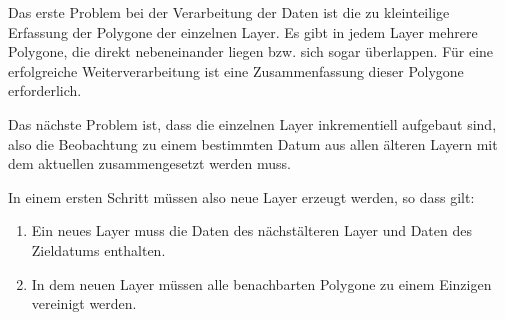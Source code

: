 Das erste Problem bei der Verarbeitung der Daten ist die zu kleinteilige Erfassung der Polygone der einzelnen Layer. Es gibt in jedem Layer mehrere Polygone, die direkt nebeneinander liegen bzw. sich sogar überlappen. Für eine erfolgreiche Weiterverarbeitung ist eine Zusammenfassung dieser Polygone erforderlich.

Das nächste Problem ist, dass die einzelnen Layer inkrementiell aufgebaut sind, also die Beobachtung zu einem bestimmten Datum aus allen älteren Layern mit dem aktuellen zusammengesetzt werden muss.

In einem ersten Schritt müssen also neue Layer erzeugt werden, so dass gilt:

\begin{enumerate}
\item Ein neues Layer muss die Daten des nächstälteren Layer und Daten des Zieldatums enthalten.
\item In dem neuen Layer müssen alle benachbarten Polygone zu einem Einzigen vereinigt werden.
\end{enumerate}

